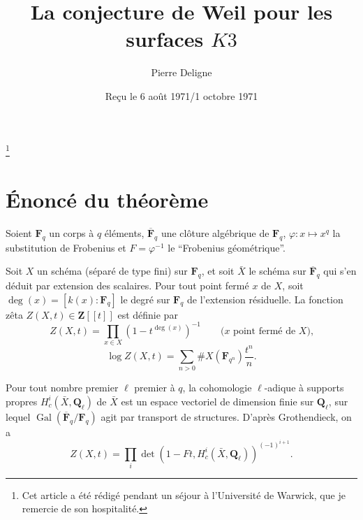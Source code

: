 \documentclass[11pt]{amsart}
\theoremstyle{plain}
\theoremstyle{definition}
\theoremstyle{remark}
\begin{document}
\title{La conjecture de Weil pour les surfaces $K3$}
\author{Pierre Deligne}
\address{Institut des Hautes \'Etudes Scientifiques, 35 Route de Chartres, F-91 Bures-sur-Yvette, France}
\thanks{Cet article a \'et\'e r\'edig\'e pendant un s\'ejour \`a l'Universit\'e de Warwick, que je remercie de son hospitalit\'e.}
\date{Re\c{c}u le 6 ao\^ut 1971/1 octobre 1971}

\maketitle

\section{\'Enonc\'e du th\'eor\`eme}

Soient $\mathbf{F}_q$ un corps \`a $q$ \'el\'ements, $\overline{\mathbf{F}}_q$ une cl\^oture alg\'ebrique de $\mathbf{F}_q$, $\varphi\colon x\mapsto x^q$ la substitution de Frobenius et $F=\varphi^{-1}$ le ``Frobenius g\'eom\'etrique''.

Soit $X$ un sch\'ema (s\'epar\'e de type fini) sur $\mathbf{F}_q$, et soit $\bar{X}$ le sch\'ema sur $\overline{\mathbf{F}}_q$ qui s'en d\'eduit par extension des scalaires. Pour tout point ferm\'e $x$ de $X$, soit $\deg(x)=[k(x):\mathbf{F}_q]$ le degr\'e sur $\mathbf{F}_q$ de l'extension r\'esiduelle. La fonction z\^eta $Z(X,t)\in\mathbf{Z}[[t]]$ est d\'efinie par
\begin{equation*}
Z(X,t)=\prod_{x\in X}(1-t^{\deg(x)})^{-1}\qquad\text{($x$ point ferm\'e de $X$),}
\end{equation*}
\begin{equation*}
\log Z(X,t)=\sum_{n>0}\#X(\mathbf{F}_{q^n})\frac{t^n}{n}.
\end{equation*}

Pour tout nombre premier $\ell$ premier \`a $q$, la cohomologie $\ell$-adique \`a supports propres $H_c^i(\bar{X},\mathbf{Q}_\ell)$ de $\bar{X}$ est un espace vectoriel de dimension finie sur $\mathbf{Q}_\ell$, sur lequel $\operatorname{Gal}(\overline{\mathbf{F}}_q/\mathbf{F}_q)$ agit par transport de structures. D'apr\`es Grothendieck, on a
\begin{equation*}
Z(X,t)=\prod_i\det(1-Ft,H_c^i(\bar{X},\mathbf{Q}_\ell))^{(-1)^{i+1}}.
\end{equation*}
\end{document}
